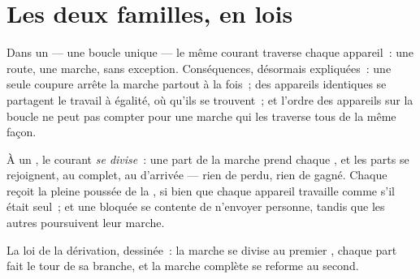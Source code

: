 \section{Les deux familles, en lois}

\begin{proposition}\label{prop:g7:circuits-series-parallel:series}
Dans un  --- une boucle unique --- le même courant
traverse chaque appareil~: une route, une marche, sans exception.
Conséquences, désormais expliquées~: une seule coupure arrête la
marche partout à la fois~; des appareils identiques se partagent le
travail à égalité, où qu'ils se trouvent~; et l'ordre des appareils
sur la boucle ne peut pas compter pour une marche qui les traverse
tous de la même façon.
\end{proposition}

\begin{proposition}\label{prop:g7:circuits-series-parallel:parallel}
À un , le courant \emph{se divise}~: une part de la marche prend
chaque , et les parts se rejoignent, au complet, au 
d'arrivée --- rien de perdu, rien de gagné. Chaque  reçoit la
pleine poussée de la , si bien que chaque appareil travaille
comme s'il était seul~; et une  bloquée se contente de
n'envoyer personne, tandis que les autres  poursuivent leur
marche.
\end{proposition}

\begin{omfigure}

{\small La loi de la dérivation, dessinée~: la marche se divise au
premier , chaque part fait le tour de sa branche, et la marche
complète se reforme au second.}
\end{omfigure}

